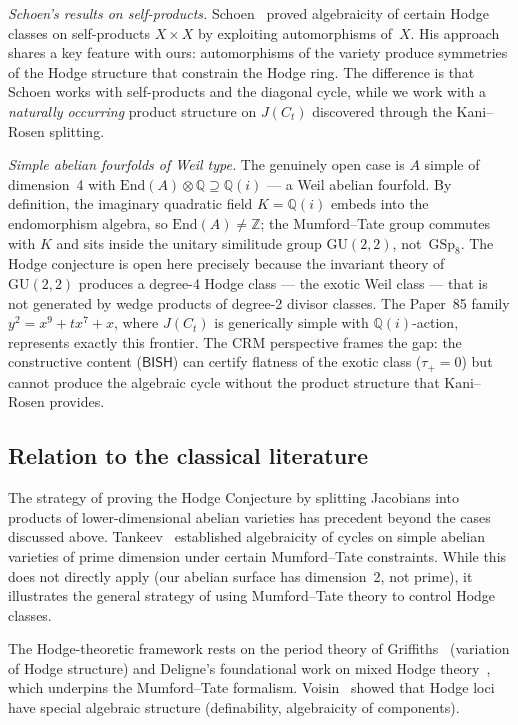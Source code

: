 \documentclass[11pt]{article}
\theoremstyle{plain}
\theoremstyle{definition}
\theoremstyle{remark}
\newcommand{\Z}{\mathbb{Z}}
\newcommand{\Q}{\mathbb{Q}}
\newcommand{\GSp}{\mathrm{GSp}}
\newcommand{\End}{\mathrm{End}}
\newcommand{\BISH}{\ensuremath{\mathsf{BISH}}}
\begin{document}
\emph{Schoen's results on self-products.}
Schoen~\cite{Schoen88} proved algebraicity of certain Hodge classes
on self-products $X \times X$ by exploiting automorphisms of~$X$.
His approach shares a key feature with ours: automorphisms of the
variety produce symmetries of the Hodge structure that constrain
the Hodge ring.  The difference is that Schoen works with
self-products and the diagonal cycle, while we work with a
\emph{naturally occurring} product structure on $J(C_t)$
discovered through the Kani--Rosen splitting.

\emph{Simple abelian fourfolds of Weil type.}
The genuinely open case is $A$ simple of dimension~4 with
$\End(A) \otimes \Q \supseteq \Q(i)$ --- a Weil abelian fourfold.
By definition, the imaginary quadratic field $K = \Q(i)$ embeds
into the endomorphism algebra, so $\End(A) \neq \Z$; the
Mumford--Tate group commutes with $K$ and sits inside the
unitary similitude group $\mathrm{GU}(2,2)$, not~$\GSp_8$.
The Hodge conjecture is open here precisely because the
invariant theory of $\mathrm{GU}(2,2)$ produces a degree-4
Hodge class --- the exotic Weil class --- that is not generated
by wedge products of degree-2 divisor classes.
The Paper~85 family $y^2 = x^9 + tx^7 + x$,
where $J(C_t)$ is generically simple with $\Q(i)$-action,
represents exactly this frontier.  The CRM perspective frames
the gap: the constructive content (\BISH) can certify flatness
of the exotic class ($\tau_+ = 0$) but cannot produce the
algebraic cycle without the product structure that Kani--Rosen
provides.

\subsection{Relation to the classical literature}

The strategy of proving the Hodge Conjecture by splitting Jacobians
into products of lower-dimensional abelian varieties has precedent
beyond the cases discussed above.
Tankeev~\cite{Tankeev82} established
algebraicity of cycles on simple abelian varieties of prime dimension
under certain Mumford--Tate constraints.  While this does not directly
apply (our abelian surface has dimension~2, not prime), it illustrates
the general strategy of using Mumford--Tate theory to control Hodge
classes.

The Hodge-theoretic framework rests on the period theory of
Griffiths~\cite{Griffiths69} (variation of Hodge structure) and
Deligne's foundational work on mixed Hodge theory~\cite{Deligne71},
which underpins the Mumford--Tate formalism.
Voisin~\cite{Voisin07} showed that Hodge loci have special
algebraic structure (definability, algebraicity of components).
\end{document}
